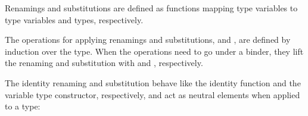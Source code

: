 \documentclass[acmsmall,anonymous,review,screen]{acmart}
\newenvironment{AgdaBlock}{%
  \vspace{\AgdaEmptySkip}%
  \AgdaNoSpaceAroundCode{}%
}{%
  \AgdaSpaceAroundCode{}
}
\begin{document}


Renamings {\ATRen} and substitutions {\ATSub} are defined as
functions mapping type variables to type variables and types, respectively.

\noindent\hspace{-\fboxsep}
\begin{minipage}{0.5\linewidth}
  \SubDefTRen
\end{minipage}
\begin{minipage}{0.5\linewidth}
  \SubDefTSub
\end{minipage}

The operations for applying renamings and substitutions, {\ATren}
and {\ATsub}, are defined by induction over the type. When the
operations need to go under a binder, they lift the renaming and
substitution with {\ATliftR} and {\ATliftS}, respectively.

\noindent\hspace{-\fboxsep}
\begin{minipage}{0.5\linewidth}
  \SubDefTren
\end{minipage}
\begin{minipage}{0.5\linewidth}
  \SubDefTsub
\end{minipage}

The identity renaming {\ATidR} and substitution
{\ATidS} behave like the identity function and the variable
type constructor, respectively, and act as neutral elements when applied to a type:

\noindent\hspace{-\fboxsep}
\begin{minipage}{0.5\linewidth}
  \begin{AgdaBlock}
    \SubDefTidR
    \TFTidRNeutral
  \end{AgdaBlock}
\end{minipage}
\begin{minipage}{0.5\linewidth}
  \begin{AgdaBlock}
    \SubDefTidS
    \TFTidSNeutral
  \end{AgdaBlock}
\end{minipage}
\end{document}
